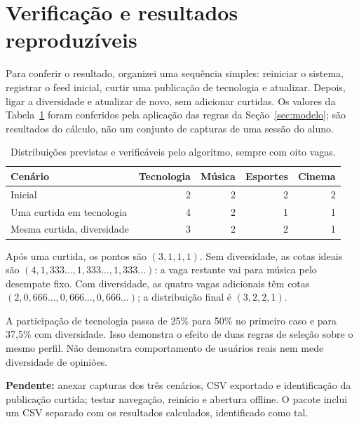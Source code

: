 \documentclass[12pt,a4paper]{article}
\newcommand{\pendente}[1]{\textbf{Pendente:} #1}
\begin{document}
\section{Verificação e resultados reproduzíveis}\label{sec:testes}
Para conferir o resultado, organizei uma sequência simples: reiniciar o sistema, registrar o feed inicial, curtir uma publicação de tecnologia e atualizar. Depois, ligar a diversidade e atualizar de novo, sem adicionar curtidas. Os valores da Tabela~\ref{tab:resultados} foram conferidos pela aplicação das regras da Seção~\ref{sec:modelo}; são resultados do cálculo, não um conjunto de capturas de uma sessão do aluno.
\begin{table}[htbp]\centering\small
\begin{tabular}{lrrrr}\toprule Cenário & Tecnologia & Música & Esportes & Cinema\\\midrule
Inicial & 2 & 2 & 2 & 2\\
Uma curtida em tecnologia & 4 & 2 & 1 & 1\\
Mesma curtida, diversidade & 3 & 2 & 2 & 1\\\bottomrule
\end{tabular}
\caption{Distribuições previstas e verificáveis pelo algoritmo, sempre com oito vagas.}\label{tab:resultados}
\end{table}
Após uma curtida, os pontos são $(3,1,1,1)$. Sem diversidade, as cotas ideais são $(4,1{,}333\ldots,1{,}333\ldots,1{,}333\ldots)$: a vaga restante vai para música pelo desempate fixo. Com diversidade, as quatro vagas adicionais têm cotas $(2,0{,}666\ldots,0{,}666\ldots,0{,}666\ldots)$; a distribuição final é $(3,2,2,1)$.

A participação de tecnologia passa de 25\% para 50\% no primeiro caso e para 37,5\% com diversidade. Isso demonstra o efeito de duas regras de seleção sobre o mesmo perfil. Não demonstra comportamento de usuários reais nem mede diversidade de opiniões.

\pendente{anexar capturas dos três cenários, CSV exportado e identificação da publicação curtida; testar navegação, reinício e abertura offline.} O pacote inclui um CSV separado com os resultados calculados, identificado como tal.
\end{document}
